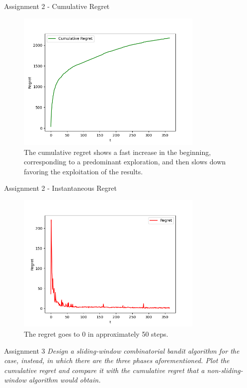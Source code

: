 \documentclass[11pt]{beamer}
\begin{document}
\begin{frame}{Assignment 2 -  Cumulative Regret}
\begin{figure}[hbtp]
\centering
\includegraphics[width=0.8\textwidth]{images/assignment_2_cum_regret.png}
\caption{The cumulative regret shows a fast increase in the beginning, corresponding to a predominant exploration, and then slows down favoring the exploitation of the results.}
\end{figure}
\end{frame}

\begin{frame}{Assignment 2 - Instantaneous Regret}
\begin{figure}[hbtp]
\centering
\includegraphics[width=0.8\textwidth]{images/assignment_2_regret.png}
\caption{The regret goes to 0 in approximately 50 steps.}
\end{figure}
\end{frame}

\begin{frame}{Assignment 3}
\textit{Design a sliding-window combinatorial bandit algorithm for the case, instead, in which there are the three phases aforementioned. Plot the cumulative regret and compare it with the cumulative regret that a non-sliding-window algorithm would obtain.}
\end{frame}
\end{document}
